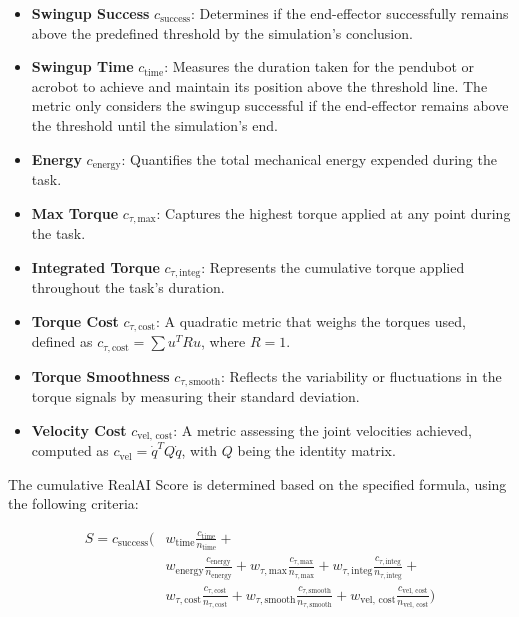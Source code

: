 \begin{itemize}
  \item \textbf{Swingup Success} \(c_{\text{success}}\):
  Determines if the end-effector successfully remains above the predefined threshold by the simulation's conclusion.
  
  \item \textbf{Swingup Time} \(c_{\text{time}}\):
  Measures the duration taken for the pendubot or acrobot to achieve and maintain its position above the threshold line. The metric only considers the swingup successful if the end-effector remains above the threshold until the simulation's end.
  
  \item \textbf{Energy} \(c_{\text{energy}}\):
  Quantifies the total mechanical energy expended during the task.
  
  \item \textbf{Max Torque} \(c_{\tau, \text{max}}\):
  Captures the highest torque applied at any point during the task.
  
  \item \textbf{Integrated Torque} \(c_{\tau, \text{integ}}\):
  Represents the cumulative torque applied throughout the task's duration.
  
  \item \textbf{Torque Cost} \(c_{\tau, \text{cost}}\):
  A quadratic metric that weighs the torques used, defined as \(c_{\tau, \text{cost}} = \sum u^TRu\), where \(R = 1\).
  
  \item \textbf{Torque Smoothness} \(c_{\tau, \text{smooth}}\):
  Reflects the variability or fluctuations in the torque signals by measuring their standard deviation.
  
  \item \textbf{Velocity Cost} \(c_{\text{vel, cost}}\):
  A metric assessing the joint velocities achieved, computed as \(c_{\text{vel}} = \dot{q}^T Q \dot{q}\), with \(Q\) being the identity matrix.
\end{itemize}

The cumulative RealAI Score is determined based on the specified formula, using the following criteria:

\begin{equation}
\begin{aligned}
S = c_{\text{success}} \Bigg(& w_{\text{time}}\frac{c_{\text{time}}}{n_{\text{time}}} + \\
& w_{\text{energy}}\frac{c_{\text{energy}}}{n_{\text{energy}}} +
w_{\tau, \text{max}}\frac{c_{\tau, \text{max}}}{n_{\tau, \text{max}}} +
w_{\tau, \text{integ}}\frac{c_{\tau, \text{integ}}}{n_{\tau, \text{integ}}} + \\
& w_{\tau, \text{cost}}\frac{c_{\tau, \text{cost}}}{n_{\tau, \text{cost}}} +
w_{\tau, \text{smooth}}\frac{c_{\tau, \text{smooth}}}{n_{\tau, \text{smooth}}} +
w_{\text{vel, cost}}\frac{c_{\text{vel, cost}}}{n_{\text{vel, cost}}} \Bigg)
\end{aligned}
\end{equation}

